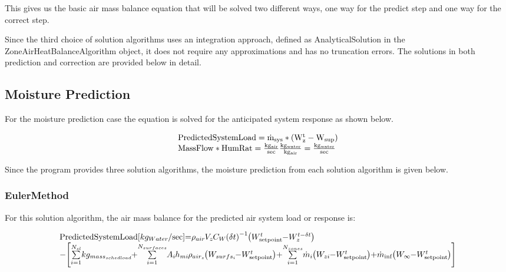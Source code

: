 This gives us the basic air mass balance equation that will be solved two different ways, one way for the predict step and one way for the correct step.

Since the third choice of solution algorithms uses an integration approach, defined as AnalyticalSolution in the ZoneAirHeatBalanceAlgorithm object, it does not require any approximations and has no truncation errors. The solutions in both prediction and correction are provided below in detail.

\subsection{Moisture Prediction}\label{moisture-prediction}

For the moisture prediction case the equation is solved for the anticipated system response as shown below.

\begin{equation}
\begin{array}{l}
    \rm{PredictedSystemLoad} = \dot{m}_{sys}*\left(W_z^t - W_{sup}\right) \\
    \rm{MassFlow * HumRat} = \frac{kg_{air}}{sec}\frac{kg_{water}}{kg_{air}} = \frac{kg_{water}}{sec}
  \end{array}
\end{equation}

Since the program provides three solution algorithms, the moisture prediction from each solution algorithm is given below.

\subsubsection{EulerMethod}\label{eulermethod-001}

For this solution algorithm, the air mass balance for the predicted air system load or response is:

\begin{equation}
\medmuskip=0mu
\thinmuskip=0mu
\thickmuskip=0mu
\nulldelimiterspace=0pt
\scriptspace=0pt
\begin{array}{l}{\rm{PredictedSystemLoad}}\;[k{g_{Water}}/\sec ] = {\rho_{air}}{V_z}{C_W}{\left( {\delta t} \right)^{ - 1}}\left( {W_{{\rm{setpoint}}}^t - W_z^{t - \delta t}} \right) \\
- \left[ {\sum\limits_{i = 1}^{{N_{sl}}} {k{g_{mas{s_{sched\;load}}}}}  + \sum\limits_{i = 1}^{{N_{surfaces}}} {{A_i}{h_{mi}}} {\rho_{ai{r_z}}}\left( {{W_{surf{s_i}}} - W_{{\rm{setpoint}}}^t} \right) + \sum\limits_{i = 1}^{{N_{zones}}} {{{\dot m}_i}} \left( {{W_{zi}} - W_{{\rm{setpoint}}}^t} \right) + {{\dot m}_{\inf }}\left( {{W_\infty } - W_{{\rm{setpoint}}}^t} \right)} \right]\\\;\;\;\;\;\;\;\;\;\;\;\;\;\;\;\;\;\;\;\;\;\;\;\;\;\;\;\;\;\;\;\;\;\;\;\end{array}
\end{equation}

